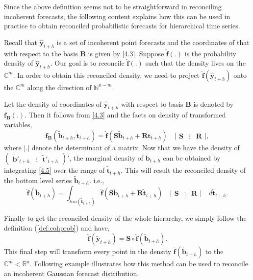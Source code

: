 \documentclass[a4paper, 11pt]{article}
\begin{document}
	Since the above definition seems not to be straightforward in reconciling incoherent forecasts, the following content explains how this can be used in practice to obtain reconciled probabilistic forecasts for hierarchical time series.
	
	Recall that $\hat{\bm{y}}_{t+h}$ is a set of incoherent point forecasts and the coordinates of that with respect to the basis $\bm{B}$ is given by \eqref{4.3}. Suppose $\hat{\bm{f}}(.)$ is the probability density of $\hat{\bm{y}}_{t+h}$. Our goal is to reconcile $\hat{\bm{f}}(.)$ such that the density lives on the $\mathbb{C}^m$. In order to obtain this reconciled density, we need to project $\hat{\bm{f}}(\hat{\bm{y}}_{t+h})$ onto the $\mathbb{C}^m$ along the direction of $\mathbb{N}^{n-m}$.
	
	Let the density of coordinates of $\hat{\bm{y}}_{t+h}$ with respect to basis $\bm{B}$ is denoted by $\bm{f_B}(.)$. Then it follows from  \eqref{4.3} and the facts on density of transformed variables,
	\begin{equation}\label{4.5}
	\bm{f_B}(\tilde{\bm{b}}_{t+h},\tilde{\bm{t}}_{t+h})=\hat{\bm{f}}(\bm{S}\tilde{\bm{b}}_{t+h}+\bm{R}\tilde{\bm{t}}_{t+h}) \quad \Big|\begin{array}{ccc}\bm{S} & \vdots& \bm{R}\end{array}\Big|,
	\end{equation}
	where $|.|$ denote the determinant of a matrix. Now that we have the density of $\begin{pmatrix}\tilde{\bm{b}}'_{t+h} & \vdots& \tilde{\bm{t}}'_{t+h}\end{pmatrix}' $, the marginal density of $\tilde{\bm{b}}_{t+h}$ can be obtained by integrating \eqref{4.5} over the range of $\tilde{\bm{t}}_{t+h}$. This will result the reconciled density of the bottom level series $\tilde{\bm{b}}_{t+h}$. i.e.,
	\begin{equation}\label{4.6}
	\tilde{\bm{f}}(\tilde{\bm{b}}_{t+h})=\int_{lim(\tilde{\bm{t}}_{t+h})}\hat{\bm{f}}(\bm{S}\tilde{\bm{b}}_{t+h}+\bm{R}\tilde{\bm{t}}_{t+h}) \quad \Big|\begin{array}{ccc}\bm{S} & \vdots& \bm{R}\end{array}\Big| \quad d\tilde{\bm{t}}_{t+h}.
	\end{equation}
	
	Finally to get the reconciled density of the whole hierarchy, we simply follow the definition (\ref{def:cohprob}) and have,
	\begin{equation}\label{4.7}
	\tilde{\bm{f}}(\tilde{\bm{y}}_{t+h})=\bm{S}\circ \tilde{\bm{f}}(\tilde{\bm{b}}_{t+h}).
	\end{equation}
	This final step will transform every point in the density $\tilde{\bm{f}}(\tilde{\bm{b}}_{t+h})$ to the $\mathbb{C}^m<\mathbb{R}^n$. Following example illustrates how this method can be used to reconcile an incoherent Gaussian forecast distribution.
	
\end{document}
